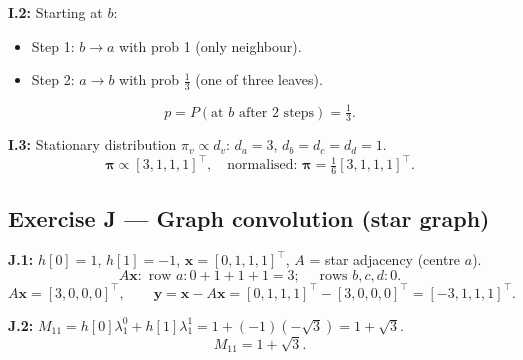 \documentclass[12pt,a4paper]{article}
\begin{document}
\textbf{I.2:} Starting at $b$:
\begin{itemize}[noitemsep]
  \item Step 1: $b\to a$ with prob 1 (only neighbour).
  \item Step 2: $a\to b$ with prob $\frac{1}{3}$ (one of three leaves).
\end{itemize}
\[
  p = P(\text{at }b\text{ after 2 steps})=\boxed{\tfrac{1}{3}.}
\]

\textbf{I.3:} Stationary distribution $\pi_v\propto d_v$:
$d_a=3$, $d_b=d_c=d_d=1$.
\[
  \boldsymbol{\pi}\propto[3,1,1,1]^\top,\quad\text{normalised: }\boldsymbol{\pi}=\tfrac{1}{6}[3,1,1,1]^\top.
\]

\subsection*{Exercise J --- Graph convolution (star graph)}

\textbf{J.1:} $h[0]=1$, $h[1]=-1$, $\mathbf{x}=[0,1,1,1]^\top$, $A$ = star adjacency (centre $a$).
\[
  A\mathbf{x}: \text{ row }a: 0+1+1+1=3;\quad\text{ rows }b,c,d: 0.
\]
\[
  A\mathbf{x}=[3,0,0,0]^\top,\qquad
  \mathbf{y}=\mathbf{x}-A\mathbf{x}=[0,1,1,1]^\top-[3,0,0,0]^\top=\boxed{[-3,1,1,1]^\top.}
\]

\textbf{J.2:} $M_{11}=h[0]\lambda_1^0+h[1]\lambda_1^1=1+(-1)(-\sqrt{3})=1+\sqrt{3}$.
\[
  \boxed{M_{11}=1+\sqrt{3}.}
\]
\end{document}
